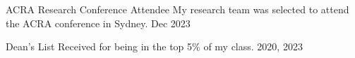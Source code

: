 
\begin{cvhonors}
	\cvhonor
	{ACRA Research Conference Attendee}
	{My research team was selected to attend the ACRA conference in Sydney.}
	{}
	{Dec 2023}

	\cvhonor
	{Dean's List}
	{Received for being in the top 5\% of my class.}
	{}
	{2020, 2023}
\end{cvhonors}

